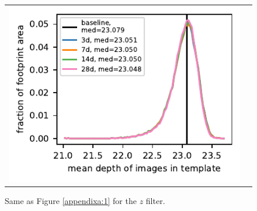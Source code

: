 \documentclass[preprintm,linenumbers]{aastex631}
\begin{document}
\begin{figure}[h]
\begin{tabular}{@{}c@{}c@{}}
					\includegraphics{results/histograms_templates_tscale/hist_first_year_one_snap_v4_0_10yrs_db_noDD_noTwi_doALLTemplateMetrics_reduceDepthTemplate_z_noDD_noTwi.pdf} \\
					
				\end{tabular}
			\caption{
				Same as Figure \ref{appendixa:1} for the $z$ filter.  \label{appendixa:5}
			}
		\end{figure}
\end{document}

